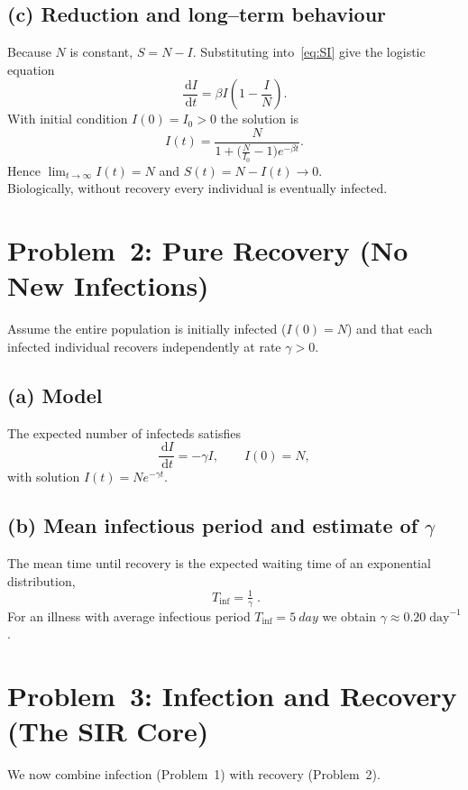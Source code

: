 \documentclass[11pt]{article}
\newcommand{\dd}{\,\mathrm{d}}
\begin{document}
\subsection*{(c) Reduction and long--term behaviour}
Because \(N\) is constant, \(S = N-I\). Substituting into~\eqref{eq:SI} give the logistic equation
\begin{equation}
\frac{\dd I}{\dd t}= \beta I\left(1-\frac{I}{N}\right).
\label{eq:logistic}
\end{equation}
With initial condition $I(0)=I_0>0$ the solution is
\[
I(t)=\frac{N}{1+\bigl(\tfrac{N}{I_0}-1\bigr)e^{-\beta t}}.
\]
Hence $\displaystyle\lim_{t\to\infty}I(t)=N$ and $S(t)=N-I(t)\to0$.  \\Biologically, without recovery every individual is eventually infected.

\section{Problem~2: Pure Recovery (No New Infections)}
Assume the entire population is initially infected ($I(0)=N$) and that each infected individual recovers independently at rate $\gamma>0$.

\subsection*{(a) Model}
The expected number of infecteds satisfies
\begin{equation}
\frac{\dd I}{\dd t}= -\gamma I,\qquad I(0)=N,
\label{eq:recovery}
\end{equation}
with solution $I(t)=N e^{-\gamma t}$.

\subsection*{(b) Mean infectious period and estimate of $\gamma$}
The mean time until recovery is the expected waiting time of an exponential distribution,
\[
\boxed{\;T_\text{inf}=\tfrac1\gamma\;}.\]
For an illness with average infectious period $T_\text{inf}=\SI{5}{day}$ we obtain $\gamma\approx0.20\;\text{day}^{-1}$.

\section{Problem~3: Infection and Recovery (The SIR Core)}
We now combine infection (Problem~1) with recovery (Problem~2).
\end{document}
